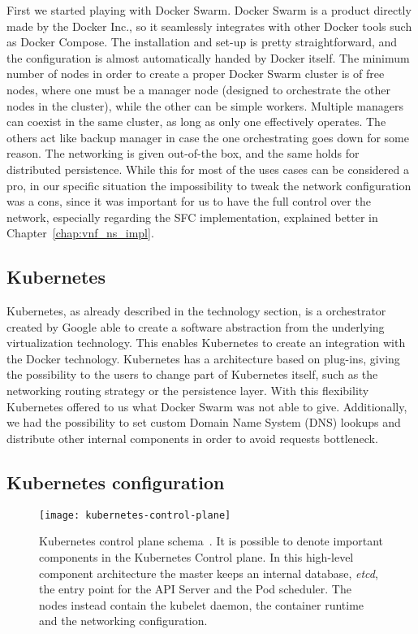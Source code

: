 First we started playing with Docker Swarm. Docker Swarm is a product directly
made by the Docker Inc., so it seamlessly integrates with other Docker tools
such as Docker Compose. The installation and set-up is pretty straightforward,
and the configuration is almost automatically handed by Docker itself. The
minimum number of nodes in order to create a proper Docker Swarm cluster is of
free nodes, where one must be a manager node (designed to orchestrate the other
nodes in the cluster), while the other can be simple workers. Multiple managers
can coexist in the same cluster, as long as only one effectively operates. The
others act like backup manager in case the one orchestrating goes down for some
reason. The networking is given out-of-the box, and the same holds for
distributed persistence. While this for most of the uses cases can be considered
a pro, in our specific situation the impossibility to tweak the network
configuration was a cons, since it was important for us to have the full control
over the network, especially regarding the SFC implementation, explained better
in Chapter~\ref{chap:vnf_ns_impl}.

\subsection{Kubernetes}
Kubernetes, as already described in the technology section, is a orchestrator
created by Google able to create a software abstraction from the underlying
virtualization technology. This enables Kubernetes to create an integration with
the Docker technology. Kubernetes has a architecture based on plug-ins, giving
the possibility to the users to change part of Kubernetes itself, such as the
networking routing strategy or the persistence layer. With this flexibility
Kubernetes offered to us what Docker Swarm was not able to give. Additionally,
we had the possibility to set custom Domain Name System (DNS) lookups and
distribute other internal components in order to avoid requests bottleneck.

\subsection{Kubernetes configuration}
\label{chap:archimpl:sec:secondattempt:sec:k8s}
\begin{figure}[t]
  \centering
  \texttt{[image: kubernetes-control-plane]}
  \caption[Kubernetes control plane schema]{Kubernetes control plane
    schema~\cite{k8scp}. It is possible to denote important components in the
    Kubernetes Control plane. In this high-level component architecture the
    master keeps an internal database, \emph{etcd}, the entry point for the API
    Server and the Pod scheduler. The nodes instead contain the kubelet daemon,
    the container runtime and the networking configuration.}
  \label{chap:archimpl:sec:secondattempt:img:k8scp}
\end{figure}

